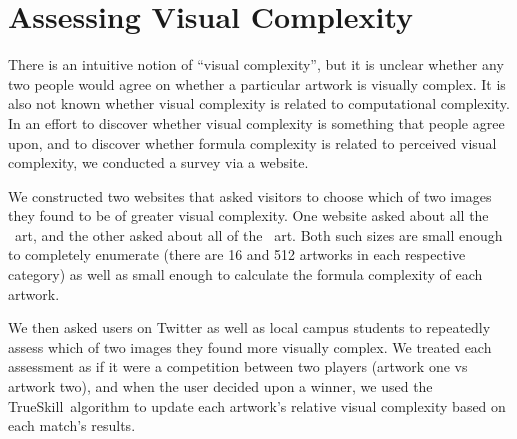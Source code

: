 \section{Assessing Visual Complexity}

There is an intuitive notion of ``visual complexity'', but it is unclear
whether any two people would agree on whether a particular artwork is visually
complex. It is also not known whether visual complexity is related to
computational complexity.  In an effort to discover whether visual complexity
is something that people agree upon, and to discover whether formula complexity
is related to perceived visual complexity, we conducted a survey via a website.

We constructed two websites that asked visitors to choose which of two images
they found to be of greater visual complexity.  One website asked about all the
\twoxtwo\ art, and the other asked about all of the \threexthree\ art.  Both
such sizes are small enough to completely enumerate (there are 16 and 512
artworks in each respective category) as well as small enough to calculate the
formula complexity of each artwork.

We then asked users on Twitter as well as local campus students to repeatedly
assess which of two images they found more visually complex.  We treated each
assessment as if it were a competition between two players (artwork one vs
artwork two), and when the user decided upon a winner, we used the
TrueSkill\texttrademark\ algorithm to update each artwork's relative visual
complexity based on each match's results.
